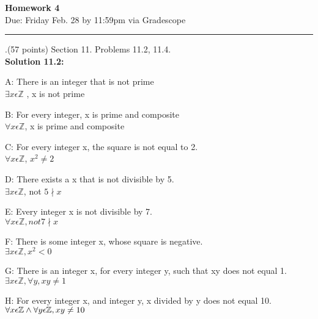 \documentclass[12pt]{article}
\begin{document}
\begin{center}
  \textbf{\Large Homework 4} \\
Due: Friday Feb. 28 by 11:59pm
via Gradescope
\end{center}

\hrule

\vspace{0.25in}

\vspace{.25in}

.(57 points)  Section 11.  Problems 11.2, 11.4.  
\vspace{.25in} \\
\textbf{Solution 11.2:} \\
 \item A: There is an integer that is not prime \\
 $\exists x \epsilon \mathbb{Z}$ , x is not prime \\ 
 \item B: For every integer, x is prime and composite \\ 
 $\forall x \epsilon \mathbb{Z}$, x is prime and composite \\
 \item C: For every integer x, the square is not equal to 2. \\
 $\forall x \epsilon \mathbb{Z}$, $x^2 \neq 2$ \\ 
 \item D: There exists a x that is not divisible by 5. \\ 
 $\exists x \epsilon \mathbb{Z} $, not $ 5\nmid x$ \\
 \item E: Every integer x is not divisible by 7. \\
 $\forall x \epsilon \mathbb{Z}, not 7\nmid x$ \\
 
 \item F: There is some integer x, whose square is negative.  \\ 
 $\exists x \epsilon \mathbb{Z}, x^2 < 0$ \\
 
 \item G: There is an integer x, for every integer y, such that xy does not equal 1. \\
 $\exists x \epsilon \mathbb{Z}, \forall y, xy \neq 1$
 
 \item H: For every integer x, and integer y, x divided by y does not equal 10.  \\ 
 $\forall x \epsilon \mathbb{Z} \wedge \forall y \epsilon \mathbb{Z}, x\/ y \neq 10$
 
\end{document}
